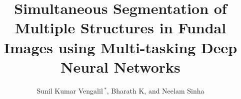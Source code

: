 \documentclass[utf8]{FrontiersinHarvard} %
\def\firstAuthorLast{Sunil Vengalil {et~al.}} %
\def\Authors{Sunil Kumar Vengalil\,$^{*}$, Bharath K, and Neelam Sinha}
\begin{document}
\onecolumn
{}

\title[Simultaneous Segmentation of Multiple Structures in Fundal Images using DNN]{Simultaneous Segmentation of Multiple Structures in Fundal Images using Multi-tasking Deep Neural Networks}

\author[\firstAuthorLast ]{\Authors} %
\address{} %
\correspondance{} %

\extraAuth{}%

\maketitle
\end{document}
